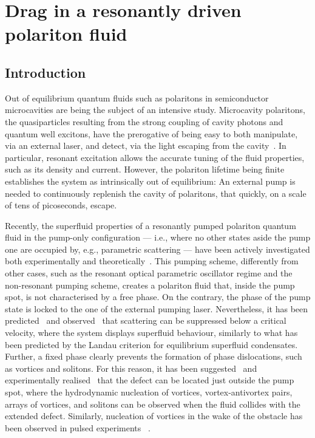 
\chapter{Drag in a resonantly driven polariton fluid}
\label{ch:drag}

\section{Introduction}
\label{sec:intro}

Out of equilibrium quantum fluids such as polaritons in semiconductor
microcavities are being the subject of an intensive study. Microcavity
polaritons, the quasiparticles resulting from the strong coupling of
cavity photons and quantum well excitons, have the prerogative of
being easy to both manipulate, via an external laser, and detect, via
the light escaping from the cavity~\cite{9780199228942}. In
particular, resonant excitation allows the accurate tuning of the
fluid properties, such as its density and current. However, the
polariton lifetime being finite establishes the system as
intrinsically out of equilibrium: An external pump is needed to
continuously replenish the cavity of polaritons, that quickly, on a
scale of tens of picoseconds, escape.

Recently, the superfluid properties of a resonantly pumped polariton
quantum fluid in the pump-only configuration --- i.e., where no other
states aside the pump one are occupied by, e.g., parametric scattering
--- have been actively investigated both experimentally and
theoretically~\cite{Carusotto_2004,Ciuti_2005,Amo_2009,Cancellieri_2010,Pigeon_2011,Amo_2011,Nardin_2011,Sanvitto_2011}. This
pumping scheme, differently from other cases, such as the resonant
optical parametric oscillator regime and the non-resonant pumping
scheme, creates a polariton fluid that, inside the pump spot, is not
characterised by a free phase. On the contrary, the phase of the pump
state is locked to the one of the external pumping
laser. Nevertheless, it has been predicted~\cite{Carusotto_2004,Ciuti_2005}
and observed~\cite{Amo_2009} that scattering can be suppressed below a
critical velocity, where the system displays superfluid behaviour,
similarly to what has been predicted by the Landau criterion for
equilibrium superfluid condensates. Further, a fixed phase clearly
prevents the formation of phase dislocations, such as vortices and
solitons. For this reason, it has been suggested~\cite{Pigeon_2011} and
experimentally realised~\cite{Amo_2011} that the defect can be
located just outside the pump spot, where the hydrodynamic nucleation
of vortices, vortex-antivortex pairs, arrays of vortices, and solitons
can be observed when the fluid collides with the extended
defect. Similarly, nucleation of vortices in the wake of the obstacle
has been observed in pulsed experiments ~\cite{Nardin_2011,Sanvitto_2011}.

